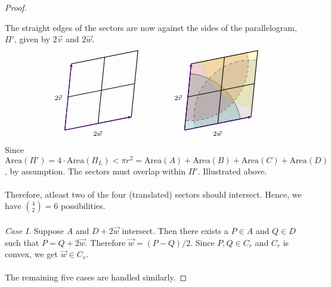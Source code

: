 \begin{proof}
\begin{itemize}
\end{itemize}
The straight edges of the sectors are now against the sides of the parallelogram, $\Pi'$, given by $2\vec{v}$ and $2\vec{w}$.
\[\begin{tikzpicture}[scale=2.75]
    \draw[thick] (0,0)--(0.102,1.0204)--(1.1224,1.2245)--(1.0204,0.2041)--(0,0);
    \draw[thick] (0.5102,0.102)--(0.6122,1.1224);
    \draw[thick] (0.051,0.5102)--(1.0714,0.7143);
    \draw[->,thick,>=stealth,color=indigo] (0,0)--(0.102,1.0204);
    \draw[->,thick,>=stealth,color=indigo] (0,0)--(1.0204,0.2041);
	\node[] at (-0.1,0.5) {\footnotesize$2\vec{v}$};
    \node[] at (0.5047,-0.05) {\footnotesize $2\vec{w}$};
\end{tikzpicture}
\qquad\qquad
\begin{tikzpicture}[scale=2.75]
    \draw[fill=teal, fill opacity=1/5] (0,0) -- +(84.3:0.875) arc (84.3:11.31:0.875);
    \draw[dashed,fill=firebrick, fill opacity=1/5] (0.102,1.0204) -- +(11.31:0.875) arc (11.31:-95.7:0.875);
    \draw[dotted,fill=yellow, fill opacity=1/5] (1.1224,1.2245) -- +(-95.7:0.875) arc (-95.7:-168.69:0.875);
    \draw[dashdotted,fill=gray, fill opacity=1/5] (1.0204,0.2041) -- +(-168.69:0.875) arc (-168.69:-275.7:0.875);
    \draw[thick] (0,0)--(0.102,1.0204)--(1.1224,1.2245)--(1.0204,0.2041)--(0,0);
    \draw[thick] (0.5102,0.102)--(0.6122,1.1224);
    \draw[thick] (0.051,0.5102)--(1.0714,0.7143);
    \draw[->,thick,>=stealth,color=indigo] (0,0)--(0.102,1.0204);
    \draw[->,thick,>=stealth,color=indigo] (0,0)--(1.0204,0.2041);
	\node[] at (-0.1,0.5) {\footnotesize$2\vec{v}$};
    \node[] at (0.5047,-0.05) {\footnotesize $2\vec{w}$};
\end{tikzpicture}\]
Since $\mathrm{Area}(\Pi') = 4\cdot \mathrm{Area}(\Pi_L) < \pi r^2 = \mathrm{Area}(A) + \mathrm{Area}(B) + \mathrm{Area}(C) + \mathrm{Area}(D)$, by assumption. The sectors must overlap within $\Pi'$. Illustrated above.\\
\\
Therefore, atleast two of the four (translated) sectors should intersect. Hence, we have $\binom{4}{2} = 6$ possibilities.\\
\\
\emph{Case I.} Suppose $A$ and $D + 2\vec{w}$ intersect. Then there exists a $P \in A$ and $Q \in D$ such that $P = Q + 2\vec{w}$. Therefore $\vec{w} = (P-Q)/2$. Since $P,Q \in C_r$ and $C_r$ is convex, we get $\vec{w} \in C_r$.\\
\\
The remaining five cases are handled similarly.
\end{proof}

